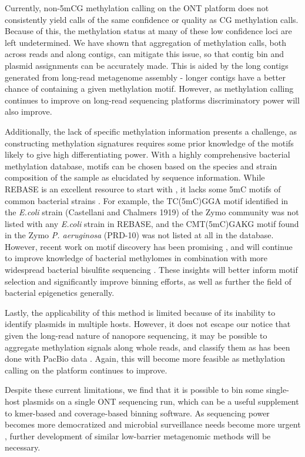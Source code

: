 Currently, non-5mCG methylation calling on the ONT platform does not consistently yield calls of the same confidence or quality as CG methylation calls. Because of this, the methylation status at many of these low confidence loci are left undetermined. We have shown that aggregation of methylation calls, both across reads and along contigs, can mitigate this issue, so that contig bin and plasmid assignments can be accurately made. This is aided by the long contigs generated from long-read metagenome assembly - longer contigs have a better chance of containing a given methylation motif. However, as methylation calling continues to improve on long-read sequencing platforms discriminatory power will also improve.

Additionally, the lack of specific methylation information presents a challenge, as constructing methylation signatures requires some prior knowledge of the motifs likely to give high differentiating power. With a highly comprehensive bacterial methylation database, motifs can be chosen based on the species and strain composition of the sample as elucidated by sequence information. While REBASE is an excellent resource to start with \citep{Roberts2003-ss}, it lacks some 5mC motifs of common bacterial strains \citep{Tourancheau2021-hv}. For example, the TC(5mC)GGA motif identified in the \textit{E.coli} strain (Castellani and Chalmers 1919) of the Zymo community was not listed with any \textit{E.coli} strain in REBASE, and the CMT(5mC)GAKG motif found in the Zymo \textit{\textit{P. aeruginosa}} (PRD-10) was not listed at all in the database. However, recent work on motif discovery has been promising \citep{Tourancheau2021-hv, Beaulaurier2018-mu}, and will continue to improve knowledge of bacterial methylomes in combination with more widespread bacterial bisulfite sequencing \citep{Oliveira_Pedro_H2021-rs}. These insights will better inform motif selection and significantly improve binning efforts, as well as further the field of bacterial epigenetics generally.

Lastly, the applicability of this method is limited because of its inability to identify plasmids in multiple hosts. However, it does not escape our notice that given the long-read nature of nanopore sequencing, it may be possible to aggregate methylation signals along whole reads, and classify them as has been done with PacBio data \citep{Beaulaurier2018-mu}. Again, this will become more feasible as methylation calling on the platform continues to improve.

Despite these current limitations, we find that it is possible to bin some single-host plasmids on a single ONT sequencing run, which can be a useful supplement to kmer-based and coverage-based binning software. As sequencing power becomes more democratized and microbial surveillance needs become more urgent \citep{Iskandar2021-eg}, further development of similar low-barrier metagenomic methods will be necessary.


